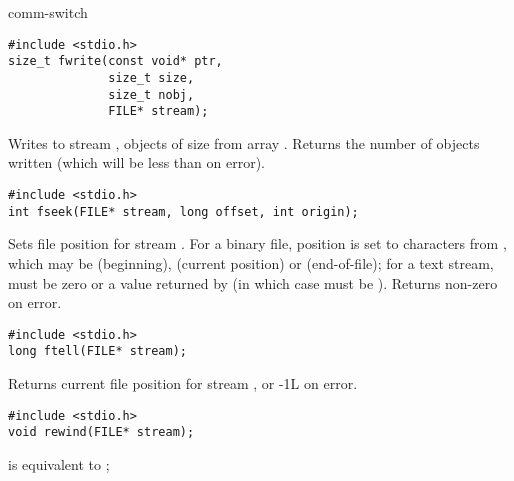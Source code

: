 \begin{Ventry2}{comm-switch  }
\item[fwrite]
\label{item:fwrite}
\begin{production}
\begin{verbatim}
#include <stdio.h>
size_t fwrite(const void* ptr, 
              size_t size, 
              size_t nobj, 
              FILE* stream);
\end{verbatim}
\end{production}

     Writes to stream ,  objects of size 
     from array . Returns the number of objects written (which
     will be less than  on error).

\item[fseek]
\label{item:fseek}
\begin{production}
\begin{verbatim}
#include <stdio.h>
int fseek(FILE* stream, long offset, int origin);
\end{verbatim}
\end{production}

     Sets file position for stream . For a binary file,
     position is set to  characters from , which
     may be  (beginning),  (current
     position) or  (end-of-file); for a text stream,
      must be zero or a value returned by  (in
     which case  must be ). Returns non-zero on
     error.

\item[ftell]
\label{item:ftell}
\begin{production}
\begin{verbatim}
#include <stdio.h>
long ftell(FILE* stream);
\end{verbatim}
\end{production}

     Returns current file position for stream , or -1L on error.

\item[rewind]
\label{item:rewind}
\begin{production}
\begin{verbatim}
#include <stdio.h>
void rewind(FILE* stream);
\end{verbatim}
\end{production}

      is equivalent to ;


\end{Ventry2}
